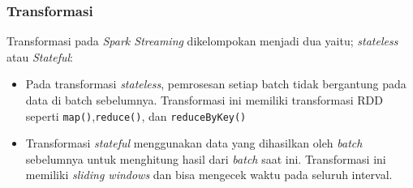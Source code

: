  
\subsubsection{Transformasi}
Transformasi pada \textit{Spark Streaming} dikelompokan menjadi dua yaitu; \textit{stateless} atau \textit{Stateful}:
\begin{itemize}
	\item{ Pada transformasi \textit{stateless}, pemrosesan setiap batch tidak bergantung pada 		data di batch sebelumnya. Transformasi ini memiliki transformasi RDD seperti 					\texttt{map()},\texttt{reduce()}, dan \texttt{reduceByKey()}	
	}
	
	\item{Transformasi \textit{stateful} menggunakan data yang dihasilkan oleh \textit{batch} 		sebelumnya 	untuk menghitung hasil dari \textit{batch} saat ini. Transformasi ini memiliki 		\textit{sliding windows} dan bisa mengecek waktu pada seluruh interval.
	
	}
\end{itemize}

